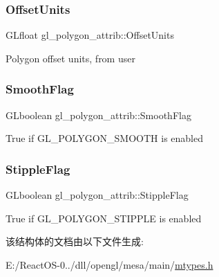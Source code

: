 \subsubsection{\texorpdfstring{Offset\+Units}{OffsetUnits}}
{\footnotesize\ttfamily G\+Lfloat gl\+\_\+polygon\+\_\+attrib\+::\+Offset\+Units}

Polygon offset units, from user \mbox{\label{structgl__polygon__attrib_aa96caf195145fff61a8d5145fca53b55}} 
\subsubsection{\texorpdfstring{Smooth\+Flag}{SmoothFlag}}
{\footnotesize\ttfamily G\+Lboolean gl\+\_\+polygon\+\_\+attrib\+::\+Smooth\+Flag}

True if G\+L\+\_\+\+P\+O\+L\+Y\+G\+O\+N\+\_\+\+S\+M\+O\+O\+TH is enabled \mbox{\label{structgl__polygon__attrib_a5f748675063df5971bd2f815c0b7b3ff}} 
\subsubsection{\texorpdfstring{Stipple\+Flag}{StippleFlag}}
{\footnotesize\ttfamily G\+Lboolean gl\+\_\+polygon\+\_\+attrib\+::\+Stipple\+Flag}

True if G\+L\+\_\+\+P\+O\+L\+Y\+G\+O\+N\+\_\+\+S\+T\+I\+P\+P\+LE is enabled 

该结构体的文档由以下文件生成\+:\begin{DoxyCompactItemize}
\item 
E\+:/\+React\+O\+S-\/0../dll/opengl/mesa/main/\hyperlink{mtypes_8h}{mtypes.\+h}\end{DoxyCompactItemize}
